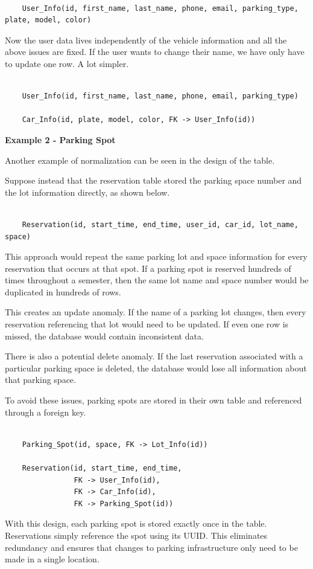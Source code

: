\documentclass[12pt]{report}
\begin{document}
\begin{verbatim}

    User_Info(id, first_name, last_name, phone, email, parking_type, plate, model, color)

\end{verbatim}

Now the user data lives independently of the vehicle information and all the above issues are fixed. If the user wants to change their name, we have only have to update one row. A lot simpler.

\begin{verbatim}

    User_Info(id, first_name, last_name, phone, email, parking_type)

    Car_Info(id, plate, model, color, FK -> User_Info(id))

\end{verbatim}


\textbf{Example 2 - Parking Spot}

Another example of normalization can be seen in the design of the
 table.

Suppose instead that the reservation table stored the parking space
number and the lot information directly, as shown below.

\begin{verbatim}

    Reservation(id, start_time, end_time, user_id, car_id, lot_name, space)

\end{verbatim}

This approach would repeat the same parking lot and space information
for every reservation that occurs at that spot. If a parking spot is
reserved hundreds of times throughout a semester, then the same lot
name and space number would be duplicated in hundreds of rows.

This creates an update anomaly. If the name of a parking lot
changes, then every reservation referencing that lot would need to be
updated. If even one row is missed, the database would contain
inconsistent data.

There is also a potential delete anomaly. If the last
reservation associated with a particular parking space is deleted, the
database would lose all information about that parking space.

To avoid these issues, parking spots are stored in their own table and
referenced through a foreign key.

\begin{verbatim}

    Parking_Spot(id, space, FK -> Lot_Info(id))

    Reservation(id, start_time, end_time,
                FK -> User_Info(id),
                FK -> Car_Info(id),
                FK -> Parking_Spot(id))

\end{verbatim}

With this design, each parking spot is stored exactly once in the
 table. Reservations simply reference the
spot using its UUID. This eliminates redundancy and ensures that
changes to parking infrastructure only need to be made in a single
location.
\end{document}
